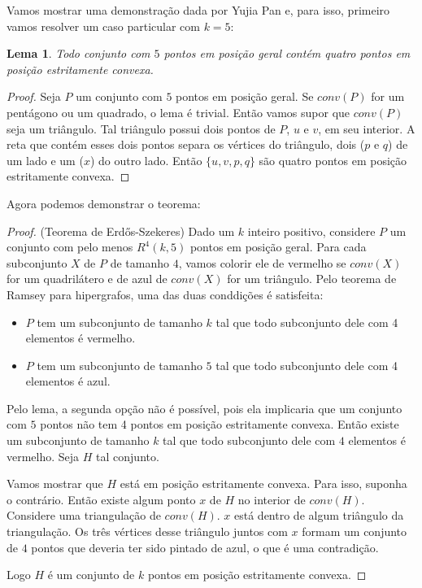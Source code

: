 \documentclass[a4paper]{book}
\newtheorem{lema}{Lema}
\begin{document}
Vamos mostrar uma demonstração dada por Yujia Pan\cite{ES} e, para isso, primeiro vamos resolver um caso particular com $k=5$:
\begin{lema}
    Todo conjunto com $5$ pontos em posição geral contém quatro pontos em posição estritamente convexa.
\end{lema}
\begin{proof}
    Seja $P$ um conjunto com $5$ pontos em posição geral. Se $conv(P)$ for um pentágono ou um quadrado, o lema é trivial.
    Então vamos supor que $conv(P)$ seja um triângulo. Tal triângulo possui dois pontos de $P$, $u$ e $v$, em seu interior. A reta que contém esses dois pontos separa os vértices do triângulo, dois ($p$ e $q$) de um lado e um ($x$) do outro lado. Então $\{u,v,p,q\}$ são quatro pontos em posição estritamente convexa.
\end{proof}

Agora podemos demonstrar o teorema:
\begin{proof}(Teorema de Erd\H os-Szekeres)
    Dado um $k$ inteiro positivo, considere $P$ um conjunto com pelo menos $R^4(k,5)$ pontos em posição geral. Para cada subconjunto $X$ de $P$ de tamanho $4$, vamos colorir ele de vermelho se $conv(X)$ for um quadrilátero e de azul de $conv(X)$ for um triângulo. Pelo teorema de Ramsey para hipergrafos, uma das duas conddições é satisfeita:
    \begin{itemize}
        \item $P$ tem um subconjunto de tamanho $k$ tal que todo subconjunto dele com 4 elementos é vermelho.
        \item $P$ tem um subconjunto de tamanho $5$ tal que todo subconjunto dele com 4 elementos é azul.
    \end{itemize}
    Pelo lema, a segunda opção não é possível, pois ela implicaria que um conjunto com $5$ pontos não tem 4 pontos em posição estritamente convexa. Então existe um subconjunto de tamanho $k$ tal que todo subconjunto dele com $4$ elementos é vermelho. Seja $H$ tal conjunto.

    Vamos mostrar que $H$ está em posição estritamente convexa. Para isso, suponha o contrário. Então existe algum ponto $x$ de $H$ no interior de $conv(H)$. Considere uma triangulação de $conv(H)$. $x$ está dentro de algum triângulo da triangulação. Os três vértices desse triângulo juntos com $x$ formam um conjunto de $4$ pontos que deveria ter sido pintado de azul, o que é uma contradição.

    Logo $H$ é um conjunto de $k$ pontos em posição estritamente convexa.
\end{proof}
\end{document}
